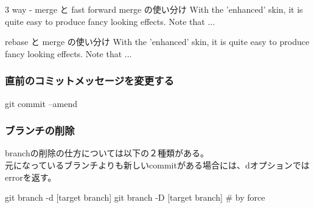 \documentclass[10pt,a4j,openany,dvipdfmx]{jsarticle}
\begin{document}


\begin{oceanbox}{3 way - merge と fast forward merge の使い分け}
With the 'enhanced' skin, it is quite easy to produce fancy looking effects.
\tcblower
Note that ...
\end{oceanbox}


\begin{oceanbox}{rebase と merge の使い分け}
With the 'enhanced' skin, it is quite easy to produce fancy looking effects.
\tcblower
Note that ...
\end{oceanbox}

\subsubsection{直前のコミットメッセージを変更する} %
\label{ssub:直前のコミットメッセージを変更する}

\begin{commandshell}
git commit --amend
\end{commandshell}

\subsubsection{ブランチの削除} %
\label{ssub:ブランチの削除}

branchの削除の仕方については以下の２種類がある。\\
元になっているブランチよりも新しいcommitがある場合には、dオプションではerrorを返す。
\begin{commandshell}
git branch -d [target branch]
git branch -D [target branch]   # by force
\end{commandshell}





\end{document}
